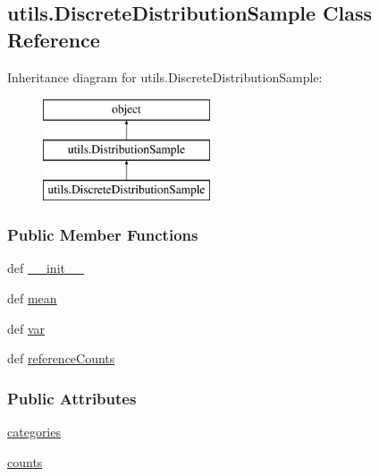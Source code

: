 \hypertarget{classutils_1_1DiscreteDistributionSample}{\subsection{utils.\-Discrete\-Distribution\-Sample Class Reference}
\label{classutils_1_1DiscreteDistributionSample}
}
Inheritance diagram for utils.\-Discrete\-Distribution\-Sample\-:\begin{figure}[H]
\begin{center}
\leavevmode
\includegraphics[height=3.000000cm]{classutils_1_1DiscreteDistributionSample}
\end{center}
\end{figure}
\subsubsection*{Public Member Functions}
\begin{DoxyCompactItemize}
\item 
def \hyperlink{classutils_1_1DiscreteDistributionSample_ad887c224af2bbd35f9295e04de237172}{\-\_\-\-\_\-init\-\_\-\-\_\-}
\item 
def \hyperlink{classutils_1_1DiscreteDistributionSample_a1eb09ddb48ca9c6d903fed7a0d1a5c18}{mean}
\item 
def \hyperlink{classutils_1_1DiscreteDistributionSample_a76e0b23eb39ea2c693ad09e1f80386ca}{var}
\item 
def \hyperlink{classutils_1_1DiscreteDistributionSample_a321a374395e5f4e56710a4a68d3b68a9}{reference\-Counts}
\end{DoxyCompactItemize}
\subsubsection*{Public Attributes}
\begin{DoxyCompactItemize}
\item 
\hyperlink{classutils_1_1DiscreteDistributionSample_afa78351d9f101acb84d2d2ad6bf71923}{categories}
\item 
\hyperlink{classutils_1_1DiscreteDistributionSample_a3521f264cfd39576b109fed45c45b5de}{counts}
\end{DoxyCompactItemize}


